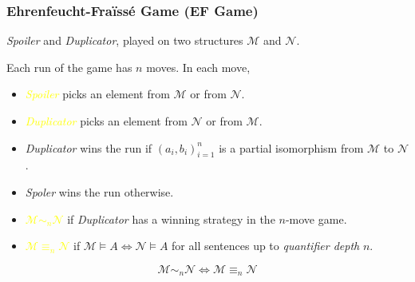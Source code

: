 \documentclass[UTF8,aspectratio=43,11pt,colorlinks,compress,openany]{beamer}%
\begin{document}
\begin{frame}\frametitle{Ehrenfeucht-Fra\"iss\'e Game (EF Game)}
\emph{Spoiler} and \emph{Duplicator}, played on two structures $\mathcal{M}$ and $\mathcal{N}$.

Each run of the game has $n$ moves. In each move,

\begin{itemize}
	\item \emph{\textcolor{yellow}{Spoiler}} picks an element from $\mathcal{M}$ or from $\mathcal{N}$.
	\item \emph{\textcolor{yellow}{Duplicator}} picks an element from $\mathcal{N}$ or from $\mathcal{M}$.
\end{itemize}
\begin{itemize}
	\item \emph{Duplicator} wins the run if $(a_i,b_i)_{i=1}^n$ is a partial isomorphism from $\mathcal{M}$ to $\mathcal{N}$.
	\item \emph{Spoler} wins the run otherwise.
\end{itemize}
\begin{itemize}
	\item \textcolor{yellow}{$\mathcal{M}\sim_n\mathcal{N}$} if \emph{Duplicator} has a winning strategy in the $n$-move game.
	\item \textcolor{yellow}{$\mathcal{M}\equiv_n\mathcal{N}$} if $\mathcal{M}\vDash A\iff\mathcal{N}\vDash A$ for all sentences up to \emph{quantifier depth} $n$.
\end{itemize}
\begin{theorem}
\[\mathcal{M}\sim_n\mathcal{N}\iff \mathcal{M}\equiv_n\mathcal{N}\]
\end{theorem}
\end{frame}
\end{document}
